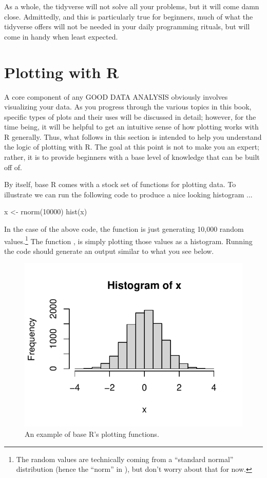 As a whole, the tidyverse will not solve all your problems, but it will come damn close. Admittedly, and this is particularly true for beginners, much of what the tidyverse offers will not be needed in your daily programming rituals, but will come in handy when least expected.

\section{Plotting with R}

A core component of any GOOD DATA ANALYSIS obviously involves visualizing your data. As you progress through the various topics in this book, specific types of plots and their uses will be discussed in detail; however, for the time being, it will be helpful to get an intuitive sense of how plotting works with R generally. Thus, what follows in this section is intended to help you understand the logic of plotting with R. The goal at this point is not to make you an expert; rather, it is to provide beginners with a base level of knowledge that can be built off of.

By itself, base R comes with a stock set of functions for plotting data. To illustrate we can run the following code to produce a nice looking histogram ...

\begin{inR}
x <- rnorm(10000)
hist(x)
\end{inR}
\vspace{1em}

\noindent
In the case of the above code, the function  is just generating 10,000 random values.\footnote{The random values are technically coming from a ``standard normal'' distribution (hence the ``norm'' in ), but don't worry about that for now.} The function , is simply plotting those values as a histogram.  Running the code should generate an output similar to what you see below.

\begin{figure}[H]
\centering
\includegraphics[scale = 0.75, trim={0 5mm 0 0},clip]{graphics/ch2Figs/base_hist.pdf}
\caption{An example of base R's plotting functions.}
\label{fig:base_hist}
\end{figure}

